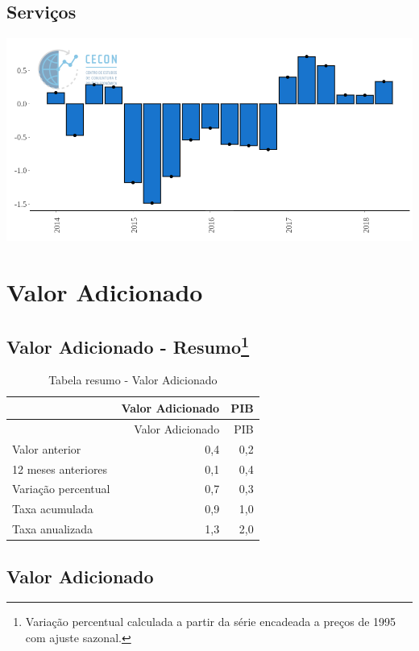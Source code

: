 \documentclass[11pt,portuguese,]{article}
\let\rmarkdownfootnote\footnote%
\def\footnote{\protect\rmarkdownfootnote}
\begin{document}
\subsection{Serviços}\label{servicos}

\begin{center}\includegraphics[width=1\linewidth]{Grafico_Servicos} \end{center}

\section{Valor Adicionado}\label{valor-adicionado}

\subsection[Valor Adicionado - Resumo]{\texorpdfstring{Valor Adicionado
- Resumo\footnote{Variação percentual calculada a partir da série
  encadeada a preços de 1995 com ajuste sazonal.}}{Valor Adicionado - Resumo}}\label{valor-adicionado---resumo3}

\begin{longtable}[]{@{}lrr@{}}
\caption{Tabela resumo - Valor Adicionado}\tabularnewline
\toprule
& Valor Adicionado & PIB\tabularnewline
\midrule
\endfirsthead
\toprule
& Valor Adicionado & PIB\tabularnewline
\midrule
\endhead
Valor anterior & 0,4 & 0,2\tabularnewline
12 meses anteriores & 0,1 & 0,4\tabularnewline
Variação percentual & 0,7 & 0,3\tabularnewline
Taxa acumulada & 0,9 & 1,0\tabularnewline
Taxa anualizada & 1,3 & 2,0\tabularnewline
\bottomrule
\end{longtable}

\subsection{Valor Adicionado}\label{valor-adicionado-1}
\end{document}
